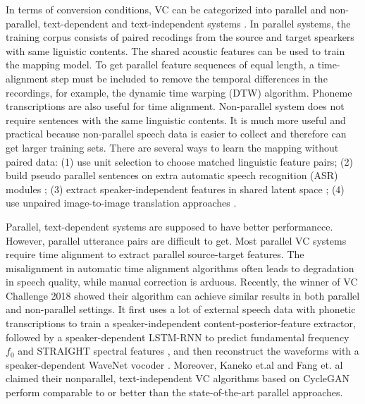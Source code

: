 \documentclass{article}
\begin{document}
In terms of conversion conditions, VC can be categorized into parallel and non-parallel, text-dependent and text-independent systems \cite{mohammadi2017overview}. In parallel systems, the training corpus consists of paired recodings from the source and target spearkers with same liguistic contents. The shared acoustic features can be used to train the mapping model. To get parallel feature sequences of equal length, a time-alignment step must be included to remove the temporal differences in the recordings, for example, the dynamic time warping (DTW) \cite{196671} algorithm. Phoneme transcriptions are also useful for time alignment. Non-parallel system does not require sentences with the same linguistic contents. It is much more useful and practical because non-parallel speech data is easier to collect and therefore can get larger training sets. There are several ways to learn the mapping without paired data: (1) use unit selection \cite{1659962} to choose matched linguistic feature pairs; (2) build pseudo parallel sentences on extra automatic speech recognition (ASR) modules \cite{Xie2016AKD}; (3) extract speaker-independent features in shared latent space \cite{Hsu2017VoiceCF}; (4) use unpaired image-to-image translation approaches \cite{NIPS2017_6672}\cite{Huang_2018_ECCV,Isola_2017_CVPR}.

Parallel, text-dependent systems are supposed to have better performancce. However, parallel utterance pairs are difficult to get. Most parallel VC systems require time alignment to extract parallel source-target features. The misalignment in automatic time alignment algorithms often leads to degradation in speech quality, while manual correction is arduous. Recently, the winner of VC Challenge 2018 \cite{DBLP:journals/corr/abs-1804-04262} showed their algorithm can achieve similar results in both parallel and non-parallel settings. It first uses a lot of external speech data with phonetic transcriptions to train a speaker-independent content-posterior-feature extractor, followed by a speaker-dependent LSTM-RNN to predict fundamental frequency $f_0$ and STRAIGHT spectral features \cite{kawahara1999restructuring}, and then reconstruct the waveforms with a speaker-dependent WaveNet vocoder \cite{tamamori2017speaker}. Moreover, Kaneko et.al \cite{kaneko2017parallel} and Fang et. al \cite{DBLP:conf/interspeech/ErroSNH11} claimed their nonparallel, text-independent VC algorithms based on CycleGAN \cite{Zhu_2017_ICCV} perform comparable to or better than the state-of-the-art parallel approaches.
\end{document}
